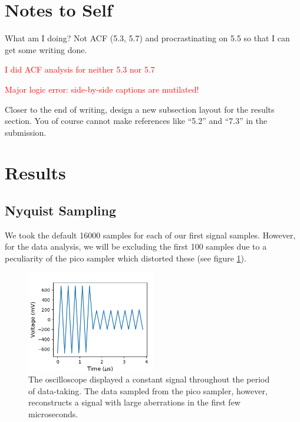 \documentclass[a4paper]{article}
\begin{document}
\section{Notes to Self}


What am I doing? Not ACF (5.3, 5.7) and procrastinating on 5.5 so that I can get some writing done.

\textcolor{red}{I did ACF analysis for neither 5.3 nor 5.7}

\textcolor{red}{Major logic error: side-by-side captions are mutilated!}


Closer to the end of writing, design a new subsection layout for the results section. You of course cannot make references like ``5.2'' and ``7.3'' in the submission.

\section{Results}

\subsection{Nyquist Sampling}


\quad \quad We took the default 16000 samples for each of our first signal samples. However, for the data analysis, we will be excluding the first 100 samples due to a peculiarity of the pico sampler which distorted these (see figure \ref{fig:pico_start}).


\begin{figure}
\centering
\includegraphics[width=0.5\textwidth]{5-2/pico_bad}
\caption{The oscilloscope displayed a constant signal throughout the period of data-taking. The data sampled from the pico sampler, however, reconstructs a signal with large aberrations in the first few microseconds.}
\label{fig:pico_start}
\end{figure}
\end{document}

